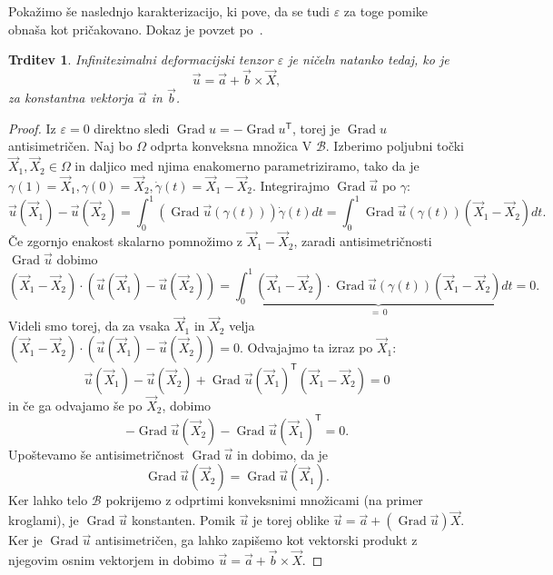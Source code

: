 \documentclass[12pt,a4paper,twoside]{article}
\theoremstyle{definition} %
\theoremstyle{plain} %
\newtheorem{trditev}[definicija]{Trditev}
\numberwithin{equation}{section}
\newcommand{\B}{\mathcal{B}}
\newcommand{\T}{\mathsf{T}}
\newcommand{\Grad}{\operatorname{Grad}}
\newcommand{\eps}{\varepsilon}
\newcommand{\vu}{\vec{u}}
\newcommand{\va}{\vec{a}}
\newcommand{\vb}{\vec{b}}
\newcommand{\vX}{\vec{X}}
\newcommand{\vXX}{\vec{X}_1}
\newcommand{\vY}{\vec{X}_2}
\begin{document}
Pokažimo še naslednjo karakterizacijo, ki pove, da se tudi $\eps$ za toge pomike
obnaša kot pričakovano. Dokaz je povzet po~\cite[str.\ 56]{gurtin1982introduction}.
\begin{trditev}
  \label{trd:eps-0}
  Infinitezimalni deformacijski tenzor $\eps$ je ničeln natanko tedaj, ko je
  \begin{equation}
    \vu = \va + \vb \times \vX,
  \end{equation}
  za konstantna vektorja $\va$ in $\vb$.
\end{trditev}
\begin{proof}
  Iz $\eps = 0$ direktno sledi $\Grad u = -\Grad u^\T$, torej je $\Grad u$ antisimetričen.
  Naj bo $\Omega$ odprta konveksna množica V $\B$. Izberimo poljubni točki $\vXX, \vY \in \Omega$
  in daljico med njima enakomerno parametriziramo, tako da je $\gamma(1) = \vXX, \gamma(0) = \vY,
  \dot\gamma(t) = \vXX-\vY$. Integrirajmo $\Grad \vu$ po $\gamma$:
  \[
    \vu(\vXX) - \vu(\vY) = \int_0^1 (\Grad\vu(\gamma(t)))\dot\gamma(t)dt =
    \int_0^1\Grad\vu(\gamma(t))(\vXX-\vY) dt.
  \]
  Če zgornjo enakost skalarno pomnožimo z $\vXX-\vY$, zaradi antisimetričnosti $\Grad \vu$ dobimo
  \[
    (\vXX - \vY)\cdot (\vu(\vXX) - \vu(\vY)) =
    \int_0^1\underbrace{(\vXX - \vY)\cdot \Grad\vu(\gamma(t))(\vXX-\vY)}_{=\,0} dt = 0.
  \]
  Videli smo torej, da za vsaka $\vXX$ in $\vY$ velja $(\vXX - \vY)\cdot (\vu(\vXX) - \vu(\vY)) = 0$.
  Odvajajmo ta izraz po $\vXX$:
  \[
    \vu(\vXX) - \vu(\vY) + \Grad\vu(\vXX)^\T(\vXX - \vY) = 0
  \]
  in če ga odvajamo še po $\vY$, dobimo
  \[
    - \Grad \vu(\vY) - \Grad\vu(\vXX)^\T = 0.
  \]
  Upoštevamo še antisimetričnost $\Grad\vu$ in dobimo, da je
  \[
    \Grad \vu(\vY) = \Grad\vu(\vXX).
  \]
  Ker lahko telo $\B$ pokrijemo z odprtimi konveksnimi množicami (na primer kroglami),
  je $\Grad\vu$ konstanten. Pomik $\vu$ je torej oblike $\vu = \va + (\Grad\vu) \vX$.
  Ker je $\Grad \vu$ antisimetričen, ga lahko zapišemo kot vektorski produkt z
  njegovim osnim vektorjem in dobimo $\vu = \va + \vb \times \vX$.
\end{proof}
\end{document}
